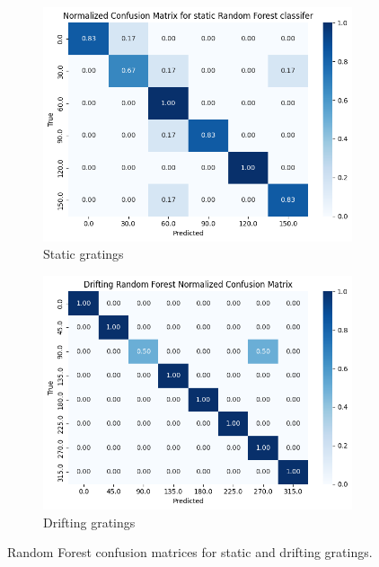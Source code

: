 \documentclass[10pt,twocolumn]{article}
\begin{document}
\begin{figure}[H]
  \centering
  \begin{subfigure}[b]{0.48\linewidth}
    \centering
    \includegraphics[width=\linewidth]{report_images/static_random_forest_confusion_matrix.png}
    \caption{Static gratings}
    \label{fig:static_rf_cm}
  \end{subfigure}
  \hfill
  \begin{subfigure}[b]{0.48\linewidth}
    \centering
    \includegraphics[width=\linewidth]{report_images/drifting_random_forest_confusion_matrix.png}
    \caption{Drifting gratings}
    \label{fig:drifting_rf_cm}
  \end{subfigure}
  \caption{Random Forest confusion matrices for static and drifting gratings.}
  \label{fig:rf_cm_comparison}
\end{figure}
\end{document}
